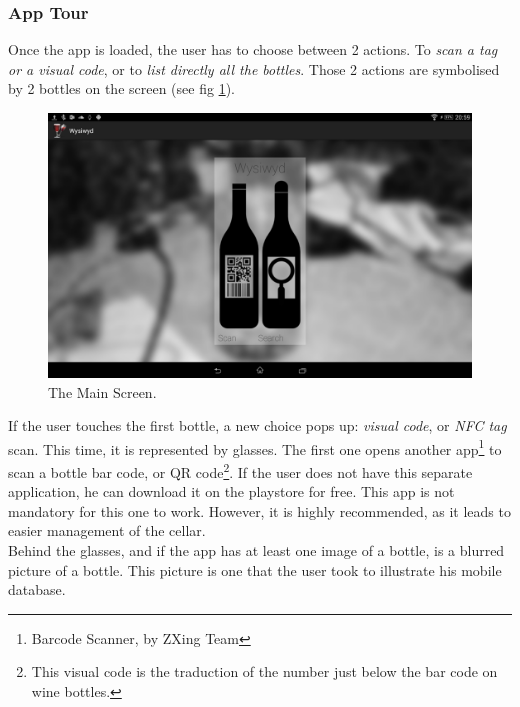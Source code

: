 \subsubsection{App Tour}

Once the app is loaded, the user has to choose between 2 actions. To \emph{scan a tag or a visual code}, or to \emph{list directly all the bottles}. Those 2 actions are symbolised by 2 bottles on the screen (see fig \ref{main_screen}).

\begin{figure}[H]
\begin{center}
	\includegraphics[width=\textwidth]{Images/MainActivity.png}
	\caption{The Main Screen.}
	\label{main_screen}
\end{center}
\end{figure}

If the user touches the first bottle, a new choice pops up: \emph{visual code}, or \emph{NFC tag} scan. This time, it is represented by glasses. The first one opens another app\footnote{Barcode Scanner, by ZXing Team} to scan a bottle bar code, or QR code\footnote{This visual code is the traduction of the number just below the bar code on wine bottles.}. If the user does not have this separate application, he can download it on the playstore for free. This app is not mandatory for this one to work. However, it is highly recommended, as it leads to easier management of the cellar.\\

Behind the glasses, and if the app has at least one image of a bottle, is a blurred picture of a bottle. This picture is one that the user took to illustrate his mobile database.


